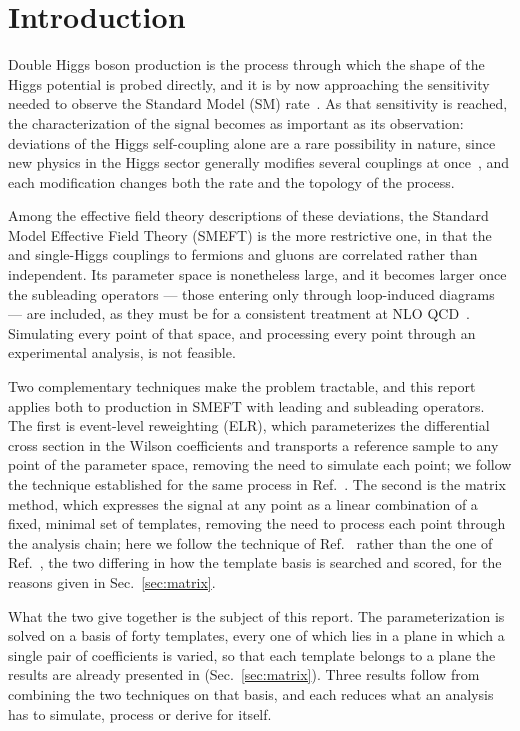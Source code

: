 \section{Introduction}
\label{sec:intro}

Double Higgs boson production is the process through which the shape of the Higgs
potential is probed directly, and it is by now approaching the sensitivity needed to
observe the Standard Model (SM) rate~\cite{ATLAS:2024ish,CMS_combination}. As that
sensitivity is reached, the characterization of the signal becomes as important as its
observation: deviations of the Higgs self-coupling alone are a rare possibility in
nature, since new physics in the Higgs sector generally modifies several couplings at
once~\cite{Durieux:2022hbu}, and each modification changes both the rate and the topology
of the process.

Among the effective field theory descriptions of these deviations, the Standard Model
Effective Field Theory (SMEFT) is the more restrictive one, in that the \HH and
single-Higgs couplings to fermions and gluons are correlated rather than independent. Its
parameter space is nonetheless large, and it becomes larger once the subleading operators
--- those entering only through loop-induced diagrams --- are included, as they must be
for a consistent treatment at NLO QCD~\cite{Heinrich:2023rsd}. Simulating every point of
that space, and processing every point through an experimental analysis, is not feasible.

Two complementary techniques make the problem tractable, and this report applies both to
\ggHH production in SMEFT with leading and subleading operators. The first is event-level
reweighting (ELR), which parameterizes the differential cross section in the Wilson
coefficients and transports a reference sample to any point of the parameter space,
removing the need to simulate each point; we follow the technique established for the
same process in Ref.~\cite{ELR_R5}. The second is the matrix method, which expresses the
signal at any point as a linear combination of a fixed, minimal set of templates,
removing the need to process each point through the analysis chain; here we follow the
technique of Ref.~\cite{HH_nonggf_R5} rather than the one of Ref.~\cite{HHMatrix_R5}, the
two differing in how the template basis is searched and scored, for the reasons given in
Sec.~\ref{sec:matrix}.

What the two give together is the subject of this report. The parameterization is solved
on a basis of forty templates, every one of which lies in a plane in which a single pair
of coefficients is varied, so that each template belongs to a plane the results are
already presented in (Sec.~\ref{sec:matrix}). Three results follow from combining the two
techniques on that basis, and each reduces what an analysis has to simulate, process or
derive for itself.

